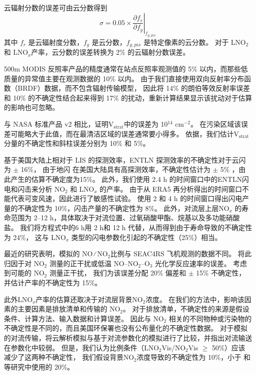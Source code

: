 云辐射分数的误差可由云分数得到
\begin{equation}
\sigma = 0.05 \times \left.\frac{\partial{f_r}}{\partial{f_g}}\right|_{f_{g,pix}}
\end{equation}
其中 $f_r$ 是云辐射度分数，$f_g$ 是云分数，$f_{g,pix}$ 是特定像素的云分数。
对于 LNO$_2$ 和 LNO$_x$产率，云分数的误差转换为 2\% 的云辐射分数误差。

500m MODIS 反照率产品的精度通常在站点反照率观测值的 5\% 以内，而那些低质量的异常值主要在观测数据的 10\% 以内\citep{Schaaf.2011}。
由于我们直接使用双向反射率分布函数（BRDF）数据，而不包含辐射传输模型，
因此将 14\% 的朗伯等效反射率误差和 10\% 的不确定性结合起来得到 17\% 的扰动\citep{Laughner.2019a}，重新计算结果显示该扰动对于估算的影响也可忽略。

与 NASA 标准产品 v2 相比，\citet{Krotkov.2017}证明V$_\textrm{strat}$中的误差为 10$^{14}$ cm$^{-2}$。
在污染区域该误差可能略大于此值，而在最清洁区域的误差通常要小得多\citep{Bucsela.2013}。
依据\citet{Allen.2019}，我们估计V$_\textrm{strat}$分量的不确定性和斜柱误差分别为 10\% 和 5\%。

基于美国大陆上相对于 LIS 的探测效率，ENTLN 探测效率的不确定性对于云闪为 $\pm$ 16\%，
由于地闪 在美国大陆具有高探测效率，不确定性估计为 $\pm$ 5\% \citep{Lapierre.2020}，由此产生的估算不确定度为15\%。
此外，我们使用 2.4 h 的时间窗口中的ENTLN闪电和闪击来分析 NO$_2$ 和 LNO$_x$ 的产率。
由于从 ERA5 再分析得出的时间窗口不能代表可变风速，因此进行了敏感性试验。
使用 2 和 4 h 的时间窗口得出闪电产量的不确定性为 10\%，闪击产量的不确定性为 8\%。
此外，对流层上层NO$_x$ 的寿命范围为 2--12 h，具体取决于对流位置、过氧硝酸甲酯、烷基以及多功能硝酸盐\citep{Nault.2017}。
我们将方程式中的6 h用 2 h和 12 h 代替，从而得到由于寿命导致的不确定性为 24\%，
这与 LNO$_x$ 类型的闪电参数化引起的不确定性（25\%）相当。

最近的研究表明，模拟的 NO ∕ NO$_2$比例与 SEAC4RS 飞机观测的数据不同\citep{Travis.2016,Silvern.2018}。
\citet{Silvern.2018}将此归因于对 NO$_2$ 测量的正干扰或低温 NO--NO$_2$--O$_3$ 光化学反应速率的误差。
考虑到可能的 NO$_2$ 测量正干扰\citep{Allen.2019,Bucsela.2019}，
我们为该误差分配 20\% 偏差和 $\pm$ 15\% 不确定性，并估计产率的不确定性为 15\%。

此外LNO$_x$产率的估算还取决于对流层背景NO$_2$浓度。
在我们的方法中，影响该因素的主要因素是排放清单和传输的 NO$_2$。
对于排放清单，不确定性的来源是假设条件、计算方法、输入数据和计算误差。
因此与 NO$_2$ 相关的不同物种或污染物的不确定性是不同的，而且美国环保署也没有公布量化的不确定性数据。
对于模拟的对流传输，\citet{Li.2018}将云解析模拟与基于对流参数化的模拟进行了比较，并指出对流输送在参数化中较弱。
但是，我们认为比例条件（LNO$_2$Vis/NO$_2$Vis $\geq$ 50\%）应该减少了这两种不确定性，
我们假设背景NO$_2$浓度导致的不确定性为 10\%，小于 \citet{Allen.2019}和\citet{Bucsela.2019}等研究中使用的 20\%。

